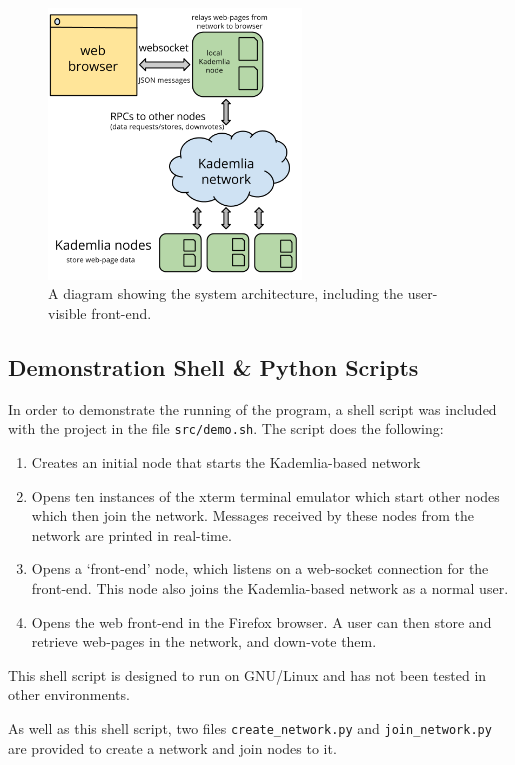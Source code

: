 \begin{figure}[H]
    \centering
    \includegraphics[width=0.6\textwidth]{img/arch-frontend.png}
    \caption{A diagram showing the system architecture, including the user-visible front-end.}
    \label{fig:arch-frontend}
\end{figure}

\subsection{Demonstration Shell \& Python Scripts}

In order to demonstrate the running of the program, a shell script was included with the project in the
file \texttt{src/demo.sh}.
The script does the following:
\begin{enumerate}
    \item {Creates an initial node that starts the Kademlia-based network}
    \item {Opens ten instances of the xterm terminal emulator which start other nodes
        which then join the network. Messages received by these nodes from the network
        are printed in real-time.}
    \item {Opens a `front-end' node, which listens on a web-socket connection for the front-end.
        This node also joins the Kademlia-based network as a normal user.}
    \item {Opens the web front-end in the Firefox browser. A user can then store and retrieve
        web-pages in the network, and down-vote them.}
\end{enumerate}

This shell script is designed to run on GNU/Linux and has not been tested in other environments.

As well as this shell script, two files \texttt{create\_network.py} and \texttt{join\_network.py}
are provided to create a network and join nodes to it.

